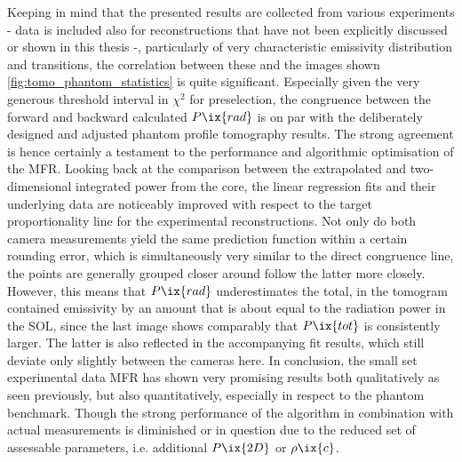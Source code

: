                 Keeping in mind that the presented results are collected from various experiments - data is included also for reconstructions that have not been explicitly discussed or shown in this thesis -, particularly of very characteristic emissivity distribution and transitions, the correlation between these and the images shown \cref{fig:tomo_phantom_statistics} is quite significant. Especially given the very generous threshold interval in $\chi^{2}$ for preselection, the congruence between the forward and backward calculated $P\ix{rad}$ is on par with the deliberately designed and adjusted phantom profile tomography results. The strong agreement is hence certainly a testament to the performance and algorithmic optimisation of the MFR. Looking back at the comparison between the extrapolated and two-dimensional integrated power from the core, the linear regression fits and their underlying data are noticeably improved with respect to the target proportionality line for the experimental reconstructions. Not only do both camera measurements yield the same prediction function within a certain rounding error, which is simultaneously very similar to the direct congruence line, the points are generally grouped closer around follow the latter more closely. However, this means that $P\ix{rad}$ underestimates the total, in the tomogram contained emissivity by an amount that is about equal to the radiation power in the SOL, since the last image shows comparably that $P\ix{tot}$ is consistently larger. The latter is also reflected in the accompanying fit results, which still deviate only slightly between the cameras here. In conclusion, the small set experimental data MFR has shown very promising results both qualitatively as seen previously, but also quantitatively, especially in respect to the phantom benchmark. Though the strong performance of the algorithm in combination with actual measurements is diminished or in question due to the reduced set of assessable parameters, i.e. additional $P\ix{2D}$ or $\rho\ix{c}$.%
%
